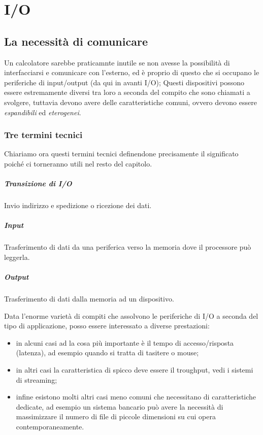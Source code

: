 \documentclass[class=book, crop=false, oneside]{standalone}
\begin{document}
\chapter{I/O}

\section{La necessità di comunicare}
Un calcolatore sarebbe praticamnte inutile se non avesse la possibilità di interfacciarsi e comunicare con l'esterno, ed è proprio di questo che si occupano le periferiche di input/output (da qui in avanti I/O); Questi dispositivi possono essere estremamente diversi tra loro a seconda del compito che sono chiamati a svolgere, tuttavia devono avere delle caratteristiche comuni, ovvero devono essere \emph{espandibili} ed \emph{eterogenei}.



\subsection*{Tre termini tecnici}
Chiariamo ora questi termini tecnici definendone precisamente il significato poiché ci torneranno utili nel resto del capitolo.
\paragraph{Transizione di I/O} Invio indirizzo e spedizione o ricezione dei dati.
\paragraph{Input} Trasferimento di dati da una periferica verso la memoria dove il processore può leggerla.
\paragraph{Output} Trasferimento di dati dalla memoria ad un dispositivo.

Data l'enorme varietà di compiti che assolvono le periferiche di I/O a  seconda del tipo di applicazione, posso essere interessato a diverse prestazioni:
\begin{itemize}
	\item in alcuni casi ad la cosa più importante è il tempo di accesso/risposta (latenza), ad esempio quando si tratta di tasitere o mouse;
	\item in altri casi la caratteristica di spicco deve essere il troughput, vedi i sistemi di streaming;
	\item infine esistono molti altri casi meno comuni che necessitano di caratteristiche dedicate, ad esempio un sistema bancario può avere la necessità di massimizzare il numero di file di piccole dimensioni su cui opera contemporaneamente.
\end{itemize}
\end{document}
